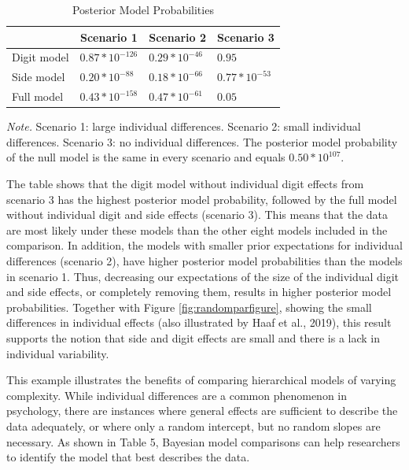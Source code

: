 \documentclass[
  english,
  doc,floatsintext]{apa6}
\begin{document}
\begin{table}[H]
\caption{Posterior Model Probabilities}
\begin{tabularx}{\textwidth}{XXXX}
\toprule
 & \multicolumn{1}{c}{Scenario 1} & \multicolumn{1}{c}{Scenario 2} & \multicolumn{1}{c}{Scenario 3}\\
\midrule
Digit model & $0.87*10^{-126}$ & $0.29*10^{-46}$ & $0.95$\\
Side model & $0.20*10^{-88}$ & $0.18*10^{-66}$ & $0.77*10^{-53}$ \\
Full model & $0.43*10^{-158}$ & $0.47*10^{-61}$ & $0.05$\\
\bottomrule
\end{tabularx}
\begin{tablenotes}[para]
\textit{Note.} Scenario 1: large individual differences. Scenario 2: small individual differences. Scenario 3: no individual differences. The posterior model probability of the null model is the same in every scenario and equals $0.50*10^{107}$. 
\end{tablenotes}
\end{table}

The table shows that the digit model without individual digit effects from scenario 3 has the highest posterior model probability, followed by the full model without individual digit and side effects (scenario 3). This means that the data are most likely under these models than the other eight models included in the comparison. In addition, the models with smaller prior expectations for individual differences (scenario 2), have higher posterior model probabilities than the models in scenario 1. Thus, decreasing our expectations of the size of the individual digit and side effects, or completely removing them, results in higher posterior model probabilities. Together with Figure \ref{fig:randomparfigure}, showing the small differences in individual effects (also illustrated by Haaf et al., 2019), this result supports the notion that side and digit effects are small and there is a lack in individual variability.

This example illustrates the benefits of comparing hierarchical models of varying complexity. While individual differences are a common phenomenon in psychology, there are instances where general effects are sufficient to describe the data adequately, or where only a random intercept, but no random slopes are necessary. As shown in Table 5, Bayesian model comparisons can help researchers to identify the model that best describes the data.
\end{document}
